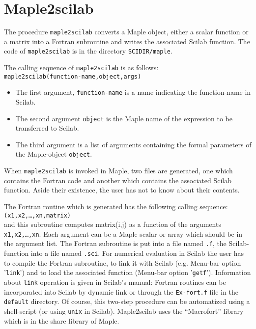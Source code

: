 \section{Maple2scilab}
The procedure \verb!maple2scilab! converts a Maple object, 
either a scalar function or a matrix into a Fortran subroutine 
and writes the associated Scilab function. The code of \verb!maple2scilab!
is in the directory \verb!SCIDIR/maple!.

The calling sequence of \verb!maple2scilab! is as follows:\\
\verb!maple2scilab(function-name,object,args)!
\begin{itemize}
\item
The first argument, \verb!function-name! is a name indicating the 
function-name in Scilab.
\item
The second argument \verb!object! is the Maple name of the expression 
to be transferred to Scilab.
\item
The third argument is a list of arguments containing the formal parameters of
the Maple-object \verb!object!.
\end{itemize}
When \verb!maple2scilab! is invoked in Maple, two files are generated,
one which contains the Fortran code and another which contains the 
associated Scilab function. Aside their existence, the user has not to
know about their contents.

The Fortran routine which is generated has the following calling sequence:\\
{\tt <Scilab-name>(x1,x2,\ldots,xn,matrix)} \\
and this subroutine computes matrix(i,j) as a function of
the arguments {\tt x1,x2,\ldots,xn}.
Each argument can be a Maple scalar or array which should be
in the argument list. 
The Fortran subroutine is put into a file named {\tt <Scilab-name>.f}, the
Scilab-function into a file named {\tt <Scilab-name>.sci}.
For numerical evaluation in Scilab the user has to compile the Fortran 
subroutine, to link it with Scilab (e.g. Menu-bar option '\verb!link!')
and to load the associated function (Menu-bar option '\verb!getf!').
Information about \verb!link! operation is given in Scilab's manual: 
Fortran routines can be incorporated into Scilab by dynamic
link or through the \verb!Ex-fort.f! file in the \verb!default! directory.
 Of course, this two-step procedure can be automatized using a shell-script 
(or using \verb!unix! in Scilab).
Maple2scilab uses the ``Macrofort'' library which is in the share 
library of Maple.
